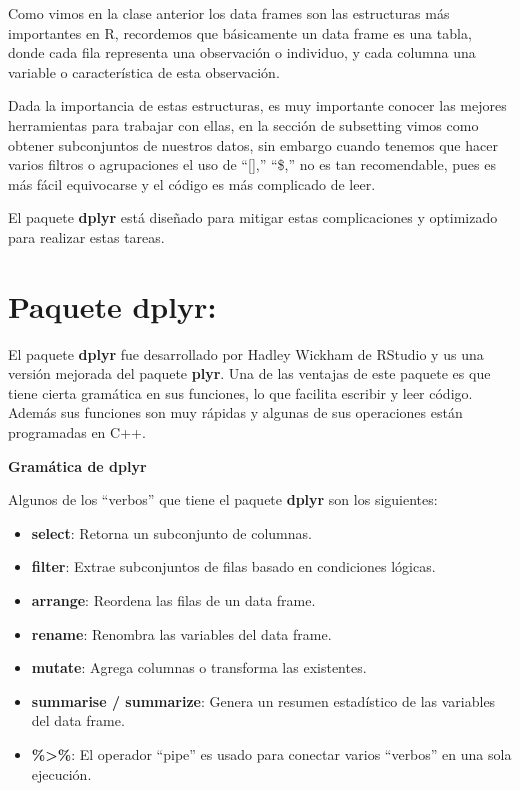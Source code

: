 \documentclass[
  12pt,
]{book}
\providecommand{\tightlist}{%
  \setlength{\itemsep}{0pt}\setlength{\parskip}{0pt}}
\begin{document}
Como vimos en la clase anterior los data frames son las estructuras más importantes en R, recordemos que básicamente un data frame es una tabla, donde cada fila representa una observación o individuo, y cada columna una variable o característica de esta observación.

Dada la importancia de estas estructuras, es muy importante conocer las mejores herramientas para trabajar con ellas, en la sección de
subsetting vimos como obtener subconjuntos de nuestros datos, sin embargo cuando tenemos que hacer varios filtros o agrupaciones el uso de ``{[}{]},'' ``\$,'' no es tan recomendable, pues es más fácil equivocarse y el código es más complicado de leer.

El paquete \textbf{dplyr} está diseñado para mitigar estas complicaciones y optimizado para realizar estas tareas.

\hypertarget{paquete-dplyr}{%
\section{\texorpdfstring{\textbf{Paquete dplyr}:}{Paquete dplyr:}}\label{paquete-dplyr}}

El paquete \textbf{dplyr} fue desarrollado por Hadley Wickham de RStudio y us una versión mejorada del paquete \textbf{plyr}. Una de las ventajas de este paquete es que tiene cierta gramática en sus funciones, lo que facilita escribir y leer código. Además sus funciones son muy rápidas y algunas de sus operaciones están programadas en C++.

\textbf{Gramática de dplyr}

Algunos de los ``verbos'' que tiene el paquete \textbf{dplyr} son los siguientes:

\begin{itemize}
\tightlist
\item
  \textbf{select}: Retorna un subconjunto de columnas.
\item
  \textbf{filter}: Extrae subconjuntos de filas basado en condiciones lógicas.
\item
  \textbf{arrange}: Reordena las filas de un data frame.
\item
  \textbf{rename}: Renombra las variables del data frame.
\item
  \textbf{mutate}: Agrega columnas o transforma las existentes.
\item
  \textbf{summarise / summarize}: Genera un resumen estadístico de las variables del data frame.
\item
  \textbf{\%\textgreater\%}: El operador ``pipe'' es usado para conectar varios ``verbos'' en una sola ejecución.
\end{itemize}
\end{document}
